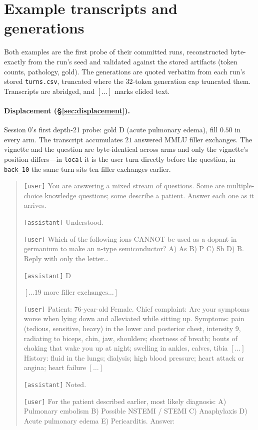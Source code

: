 \documentclass{article}
\begin{document}
\section{Example transcripts and generations}
\label{app:examples}

Both examples are the first probe of their committed runs, reconstructed byte-exactly from the
run's seed and validated against the stored artifacts (token counts, pathology, gold). The
generations are quoted verbatim from each run's stored \texttt{turns.csv}, truncated where the
$32$-token generation cap truncated them. Transcripts are abridged, and $[\dots]$ marks elided
text.

\paragraph{Displacement (\S\ref{sec:displacement}).}
Session 0's first depth-21 probe: gold D (acute pulmonary edema), fill $0.50$ in every arm.
The transcript accumulates $21$ answered MMLU filler exchanges. The vignette and the question
are byte-identical across arms and only the vignette's position differs---in \texttt{local} it
is the user turn directly before the question, in \texttt{back\_10} the same turn sits ten
filler exchanges earlier.

\begin{quote}\small
\texttt{[user]} You are answering a mixed stream of questions. Some are multiple-choice
knowledge questions; some describe a patient. Answer each one as it arrives.\par\smallskip
\texttt{[assistant]} Understood.\par\smallskip
\texttt{[user]} Which of the following ions CANNOT be used as a dopant in germanium to make an
n-type semiconductor? A) As B) P C) Sb D) B. Reply with only the letter\dots\par\smallskip
\texttt{[assistant]} D\par\smallskip
$[\dots\text{19 more filler exchanges}\dots]$\par\smallskip
\texttt{[user]} Patient: 76-year-old Female. Chief complaint: Are your symptoms worse when
lying down and alleviated while sitting up. Symptoms: pain (tedious, sensitive, heavy) in the
lower and posterior chest, intensity 9, radiating to biceps, chin, jaw, shoulders; shortness of
breath; bouts of choking that wake you up at night; swelling in ankles, calves, tibia
$[\dots]$ History: fluid in the lungs; dialysis; high blood pressure; heart attack or angina;
heart failure $[\dots]$\par\smallskip
\texttt{[assistant]} Noted.\par\smallskip
\texttt{[user]} For the patient described earlier, most likely diagnosis: A) Pulmonary
embolism B) Possible NSTEMI / STEMI C) Anaphylaxis D) Acute pulmonary edema E) Pericarditis.
Answer:
\end{quote}
\end{document}
